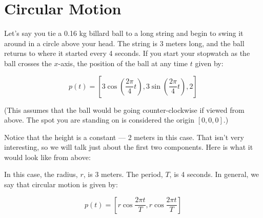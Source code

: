 \chapter{Circular Motion}

Let's say you tie a 0.16 kg billard ball to a long string and begin to swing
it around in a circle above your head. The string is 3
meters long, and the ball returns to where it started every 4
seconds. If you start your stopwatch as the ball crosses the
$x$-axis, the position of the ball at any time $t$ given by:

$$p(t) = [3 \cos{\left( \frac{2 \pi} {4}t\right)}, 3 \sin{ \left( \frac{2 \pi}{4}t\right) }, 2]$$

(This assumes that the ball would be going counter-clockwise if viewed
from above. The spot you are standing on is considered the origin $[0, 0, 0]$.)

Notice that the height is a constant --- 2 meters in this
case. That isn't very interesting, so we will talk just about the
first two components.  Here is what it would look like from above:


In this case, the radius, $r$, is 3 meters.  The period, $T$, is 4
seconds.  In general, we say that circular motion is given by:

$$p(t) = \left[ r \cos{\frac{2 \pi t}{T}}, r \cos{\frac{2 \pi t}{T}}\right]$$

